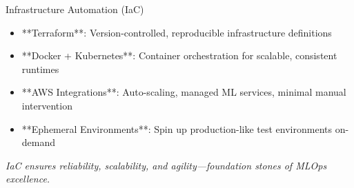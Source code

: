 \documentclass[aspectratio=169]{beamer}
\begin{document}
%
%
%
\begin{frame}{Infrastructure Automation (IaC)}
\begin{itemize}
\item **Terraform**: Version-controlled, reproducible infrastructure definitions
\item **Docker + Kubernetes**: Container orchestration for scalable, consistent runtimes
\item **AWS Integrations**: Auto-scaling, managed ML services, minimal manual intervention
\item **Ephemeral Environments**: Spin up production-like test environments on-demand
\end{itemize}

\emph{IaC ensures reliability, scalability, and agility—foundation stones of MLOps excellence.}
\end{frame}
\end{document}
